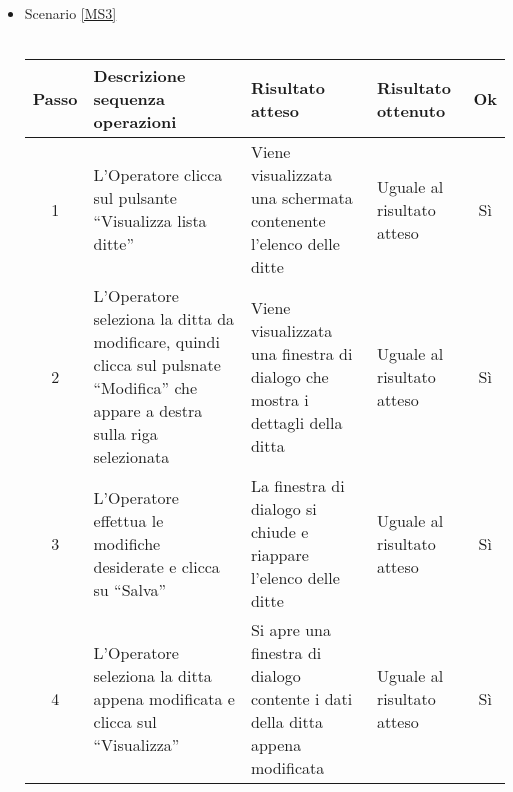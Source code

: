 \begin{itemize}
 \item Scenario \ref{MS3}\\\\
 {
 \footnotesize
  \begin{longtable}{|c|p{3cm}|p{3cm}|p{3cm}|c|}
    \hline
    Passo & Descrizione sequenza operazioni & Risultato atteso & Risultato ottenuto & Ok\\
    \hline
    1 & L'Operatore clicca sul pulsante ``Visualizza lista ditte'' & Viene visualizzata una schermata contenente l'elenco delle ditte & Uguale 
      al risultato atteso& Sì\\
    \hline
    2 & L'Operatore seleziona la ditta da modificare, quindi clicca sul pulsnate ``Modifica'' che appare a destra sulla riga selezionata& Viene visualizzata una finestra di dialogo che mostra i dettagli
    della ditta& Uguale al risultato atteso & Sì\\
    \hline
    3 & L'Operatore effettua le modifiche desiderate e clicca su ``Salva''& La finestra di dialogo si chiude e riappare l'elenco delle ditte & Uguale al risultato atteso & Sì\\
    \hline
    4 & L'Operatore seleziona la ditta appena modificata e clicca sul ``Visualizza'' & Si apre una finestra di dialogo contente i dati della ditta appena modificata & Uguale al risultato atteso& Sì\\
    \hline
\end{longtable}
}


\end{itemize}
